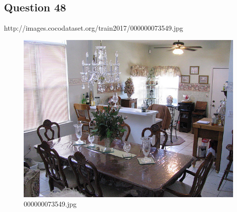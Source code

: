 \subsection*{Question 48}
http://images.cocodataset.org/train2017/000000073549.jpg
\begin{figure}[h]
    \centering
    \includegraphics[width=0.8\linewidth]{../image set/hard/000000073549.jpg}
    \caption{000000073549.jpg}
\end{figure}
